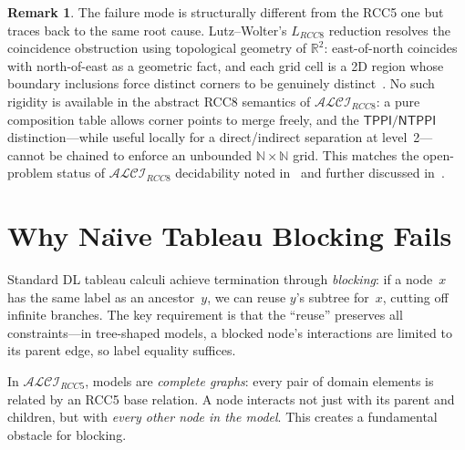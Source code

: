 \documentclass[
]{ceurart}
\theoremstyle{definition}
\newtheorem{remark}[theorem]{Remark}
\newcommand{\ALCIRCC}[1]{\ensuremath{\mathcal{ALCI}_{\mathit{RCC#1}}}}
\newcommand{\LRCC}[1]{\ensuremath{L_{\mathit{RCC#1}}}}
\newcommand{\TPPI}{\ensuremath{\mathsf{TPPI}}}
\newcommand{\NTPPI}{\ensuremath{\mathsf{NTPPI}}}
\newcommand{\naturals}{\mathbb{N}}
\newcommand{\reals}{\mathbb{R}}
\begin{document}
\begin{remark}
The failure mode is structurally different from the RCC5 one but
traces back to the same root cause.  Lutz--Wolter's $\LRCC{8}$
reduction resolves the coincidence obstruction using topological
geometry of $\reals^2$: east-of-north coincides with north-of-east
as a geometric fact, and each grid cell is a 2D region whose
boundary inclusions force distinct corners to be genuinely
distinct~\cite{LutzWolter2006}.  No such rigidity is available in
the abstract RCC8 semantics of $\ALCIRCC{8}$: a pure composition
table allows corner points to merge freely, and the $\TPPI/\NTPPI$
distinction---while useful locally for a direct/indirect
separation at level~2---cannot be chained to enforce an unbounded
$\naturals \times \naturals$ grid.  This matches the open-problem
status of $\ALCIRCC{8}$ decidability noted in~\cite{LutzWolter2006}
and further discussed in~\cite{Wessel2003}.
\end{remark}

\section{Why Na\"{\i}ve Tableau Blocking Fails}
\label{sec:naive-blocking}

Standard DL tableau calculi achieve termination through
\emph{blocking}: if a node~$x$ has the same label as an ancestor~$y$,
we can reuse $y$'s subtree for~$x$, cutting off infinite
branches.  The key requirement is that the ``reuse'' preserves
all constraints---in tree-shaped models, a blocked node's
interactions are limited to its parent edge, so label equality suffices.

In $\ALCIRCC{5}$, models are \emph{complete graphs}: every pair
of domain elements is related by an RCC5 base relation.
A node interacts not just with its parent and children, but with
\emph{every other node in the model}.
This creates a fundamental obstacle for blocking.
\end{document}
